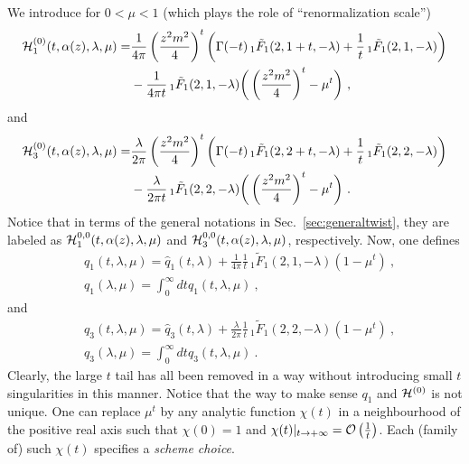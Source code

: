 \documentclass[a4paper,11pt]{article}
\begin{document}
We introduce for $0<\mu<1$ (which plays the role of ``renormalization scale'')
\begin{align}
{\cal H}_1^{(0)}(t,\alpha(z),\lambda,\mu)=&\frac{1}{4\pi}\left(\frac{z^2m^2}{4}\right)^{t}\bigg(\Gamma(-t)\,_1\tilde F_1(2,1+t,-\lambda)+\frac{1}{t}\,_1\tilde F_1(2,1,-\lambda)\bigg)\nonumber \\ 
&-\frac{1}{4\pi t}\,_1\tilde F_1(2,1,-\lambda)\bigg(\left(\frac{z^2m^2}{4}\right)^{t}-\mu^t\bigg)\ , 
\end{align}
and
\begin{align}
{\cal H}_3^{(0)}(t,\alpha(z),\lambda,\mu)=&\frac{\lambda}{2\pi}\left(\frac{z^2m^2}{4}\right)^{t}\bigg(\Gamma(-t)\,_1\tilde F_1(2,2+t,-\lambda)+\frac{1}{t}\,_1\tilde F_1(2,2,-\lambda)\bigg)\nonumber \\ 
&-\frac{\lambda}{2\pi t}\,_1\tilde F_1(2,2,-\lambda)\bigg(\left(\frac{z^2m^2}{4}\right)^{t}-\mu^t\bigg)\ .
\end{align}
Notice that in terms of the general notations in Sec.~\ref{sec:generaltwist}, they are labeled as  ${\cal H}_1^{0,0}(t,\alpha(z),\lambda,\mu)$ and ${\cal H}_3^{0,0}(t,\alpha(z),\lambda,\mu)$, respectively. Now, one defines 
\begin{align}
&q_1(t,\lambda,\mu)=\hat q_1(t,\lambda)+\frac{1}{4\pi}\frac{1}{t}\,_1\tilde F_1(2,1,-\lambda)(1-\mu^t) \ , \\ 
&q_1(\lambda,\mu)=\int_0^{\infty} dt q_1(t,\lambda,\mu) \ , \label{eq:q1mu}
\end{align}
and
\begin{align}
&q_3(t,\lambda,\mu)=\hat q_3(t,\lambda)+\frac{\lambda}{2\pi}\frac{1}{t}\,_1\tilde F_1(2,2,-\lambda)(1-\mu^t) \ , \\ 
&q_3(\lambda,\mu)=\int_0^{\infty} dt q_3(t,\lambda,\mu) \ . \label{eq:q3mu}
\end{align}
Clearly, the large $t$ tail has all been removed in a way without introducing small $t$ singularities in this manner. Notice that the way to make sense $q_1$ and ${\cal H}^{(0)}$ is not unique. One can replace $\mu^t$ by any analytic function $\chi(t)$ in a neighbourhood of the positive real axis such that $\chi(0)=1$ and $\chi(t)|_{t\rightarrow +\infty}={\cal O}\left(\frac{1}{t}\right)$. Each (family of) such $\chi(t)$ specifies a {\it scheme choice}. 
\end{document}
